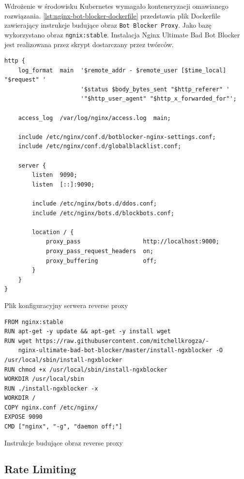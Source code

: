 Wdrożenie w środowisku Kubernetes wymagało konteneryzacji omawianego rozwiązania.
\autoref{lst:nginx-bot-blocker-dockerfile} przedstawia plik Dockerfile zawierający instrukcje budujące obraz \texttt{Bot Blocker Proxy}.
Jako bazę wykorzystano obraz \texttt{ngnix:stable}.
Instalacja Nginx Ultimate Bad Bot Blocker jest realizowana przez skrypt dostarczany przez twórców.

\begin{listing}[p]
    \begin{verbatim}
http {
    log_format  main  '$remote_addr - $remote_user [$time_local] "$request" '
                      '$status $body_bytes_sent "$http_referer" '
                      '"$http_user_agent" "$http_x_forwarded_for"';

    access_log  /var/log/nginx/access.log  main;

    include /etc/nginx/conf.d/botblocker-nginx-settings.conf;
    include /etc/nginx/conf.d/globalblacklist.conf;

    server {
	    listen  9090;
	    listen  [::]:9090;

	    include /etc/nginx/bots.d/ddos.conf;
        include /etc/nginx/bots.d/blockbots.conf;

	    location / {
		    proxy_pass                  http://localhost:9000;
		    proxy_pass_request_headers  on;
		    proxy_buffering             off;
	    }
    }
}
    \end{verbatim}
    \caption{Plik konfiguracyjny serwera reverse proxy}
    \label{lst:nginx-bot-blocker-conf}
\end{listing}

\begin{listing}[p]
    \begin{verbatim}
FROM nginx:stable
RUN apt-get -y update && apt-get -y install wget
RUN wget https://raw.githubusercontent.com/mitchellkrogza/-
    nginx-ultimate-bad-bot-blocker/master/install-ngxblocker -O /usr/local/sbin/install-ngxblocker
RUN chmod +x /usr/local/sbin/install-ngxblocker
WORKDIR /usr/local/sbin
RUN ./install-ngxblocker -x
WORKDIR /
COPY nginx.conf /etc/nginx/
EXPOSE 9090
CMD ["nginx", "-g", "daemon off;"]
    \end{verbatim}
    \caption{Instrukcje budujące obraz reverse proxy}
    \label{lst:nginx-bot-blocker-dockerfile}
\end{listing}

\newpage

\subsection{Rate Limiting}\label{subsec:rate-limiting-impl}

